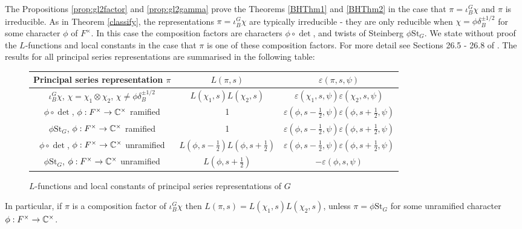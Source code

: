 The Propositions \ref{prop:gl2factor} and \ref{prop:gl2gamma} prove the Theorems \ref{BHThm1} and \ref{BHThm2} in the case that $\pi = \iota_B^G \chi$ and $\pi$ is irreducible. As in Theorem \ref{classify}, the representations $\pi = \iota_B^G \chi$ are typically irreducible - they are only reducible when $\chi = \phi \delta_B^{\pm 1/2}$ for some character $\phi$ of $F^\times$. In this case the composition factors are characters $\phi \circ \det$, and twists of Steinberg $\phi \mathrm{St}_G$. We state without proof the $L$-functions and local constants in the case that $\pi$ is one of these composition factors. For more detail see Sections 26.5 - 26.8 of \cite{BH1}. The results for all principal series representations are summarised in the following table:

\begin{figure}[!ht]
    \centering
    \begin{tabular}{ |c|c|c| }
        \hline
        Principal series representation $\pi$ & $L(\pi,s)$ & $\varepsilon(\pi,s,\psi)$ \\ \hline
        $\iota_B^G \chi$, $\chi=\chi_1\otimes \chi_2$, $\chi \neq \phi \delta_B^{\pm 1/2}$ & $L(\chi_1,s)L(\chi_2,s)$ & $\varepsilon(\chi_1,s,\psi)\varepsilon(\chi_2,s,\psi)$ \\ 
        $\phi \circ \det$, $\phi :F^\times \to \mathbb{C}^\times$ ramified & 1 & $\varepsilon(\phi,s-\frac{1}{2},\psi)\varepsilon(\phi,s+\frac{1}{2},\psi)$ \\ 
        $\phi \mathrm{St}_G$, $\phi :F^\times \to \mathbb{C}^\times$ ramified & 1 & $\varepsilon(\phi,s-\frac{1}{2},\psi)\varepsilon(\phi,s+\frac{1}{2},\psi)$ \\  
        $\phi \circ \det$, $\phi :F^\times \to \mathbb{C}^\times$ unramified & $L(\phi,s-\frac{1}{2})L(\phi,s+\frac{1}{2})$ & $\varepsilon(\phi,s-\frac{1}{2},\psi)\varepsilon(\phi,s+\frac{1}{2},\psi)$ \\ 
        $\phi \mathrm{St}_G$, $\phi :F^\times \to \mathbb{C}^\times$ unramified & $L(\phi,s+\frac{1}{2})$ & $-\varepsilon(\phi,s,\psi)$ \\     
        \hline
       \end{tabular}
       \caption{$L$-functions and local constants of principal series representations of $G$}
\end{figure}

In particular, if $\pi$ is a composition factor of $\iota_B^G \chi$ then $L(\pi,s) = L(\chi_1,s)L(\chi_2,s)$, unless $\pi = \phi \mathrm{St}_G$ for some unramified character $\phi : F^\times \to \mathbb{C}^\times$.
